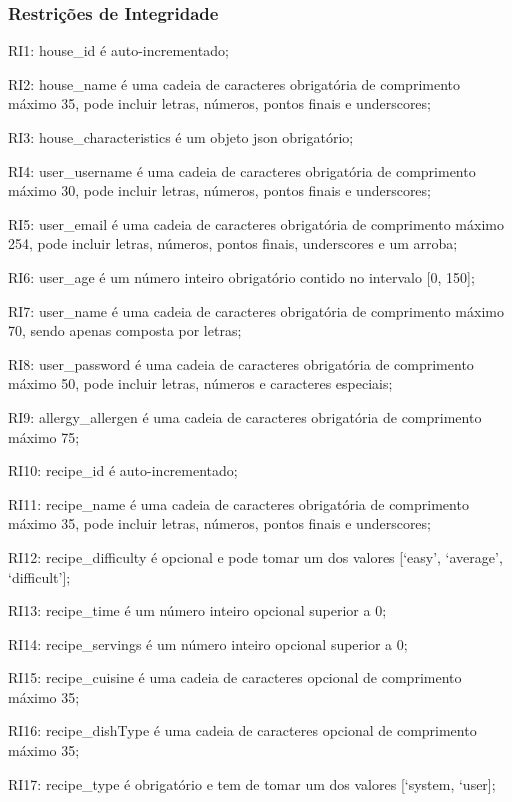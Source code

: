 \subsubsection{Restrições de Integridade}
\begin{description}
	\item RI1: house\_id é auto-incrementado;
	\item RI2: house\_name é uma cadeia de caracteres obrigatória de comprimento máximo 35, pode incluir letras, números, pontos finais e underscores;
	\item RI3: house\_characteristics é um objeto \acrshort{json} obrigatório;
	\item RI4: user\_username é uma cadeia de caracteres obrigatória de comprimento máximo 30, pode incluir letras, números, pontos finais e underscores;
	\item RI5: user\_email é uma cadeia de caracteres obrigatória de comprimento máximo 254, pode incluir letras, números, pontos finais, underscores e um arroba;
	\item RI6: user\_age é um número inteiro obrigatório contido no intervalo [0, 150];
	\item RI7: user\_name é uma cadeia de caracteres obrigatória de comprimento máximo 70, sendo apenas composta por letras;
	\item RI8: user\_password é uma cadeia de caracteres obrigatória de comprimento máximo 50, pode incluir letras, números e caracteres especiais;
	\item RI9: allergy\_allergen é uma cadeia de caracteres obrigatória de comprimento máximo 75;
	\item RI10: recipe\_id é auto-incrementado;
	\item RI11: recipe\_name é uma cadeia de caracteres obrigatória de comprimento máximo 35, pode incluir letras, números, pontos finais e underscores;
	\item RI12: recipe\_difficulty é opcional e pode tomar um dos valores [‘easy’, ‘average’, ‘difficult’];
	\item RI13: recipe\_time é um número inteiro opcional superior a 0;
	\item RI14: recipe\_servings é um número inteiro opcional superior a 0;
	\item RI15: recipe\_cuisine é uma cadeia de caracteres opcional de comprimento máximo 35;
	\item RI16: recipe\_dishType é uma cadeia de caracteres opcional de comprimento máximo 35;
	\item RI17: recipe\_type é obrigatório e tem de tomar um dos valores [‘system, ‘user];

\end{description}
